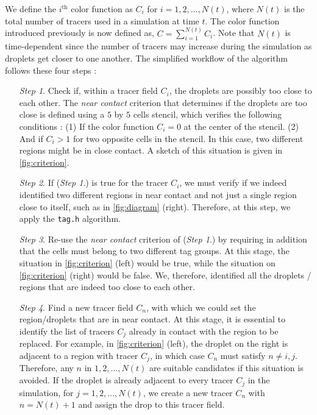 \documentclass[11pt]{My_preprint}
\begin{document}
We define the $i^\text{th}$ color function as $C_i$ for $i =1,2,\ldots,N(t)$, where $N(t)$ is the total number of tracers used in a simulation at time $t$.
The color function introduced previously is now defined as, $C = \sum_{i=1}^{N(t)} C_i$. 
Note that $N(t)$ is time-dependent since the number of tracers may increase during the simulation as droplets get closer to one another.
The simplified workflow of the algorithm follows these four steps : 
\begin{enumerate}
    \item[\textit{Step 1}.] Check if, within a tracer field $C_i$, the droplets are possibly too close to each other. 
    The \textit{near contact} criterion that determines if the droplets are too close is defined using a $5$ by $5$ cells stencil, which verifies the following conditions : 
    (1) If the color function $C_i = 0$ at the center of the stencil. 
    (2) And if $C_i > 1$ for two opposite cells in the stencil. 
    In this case, two different regions might be in close contact.
    A sketch of this situation is given in \ref{fig:criterion}.  
    \item[\textit{Step 2}.] 
    If (\textit{Step 1}.) is true for the tracer $C_i$, we must verify if we indeed identified two different regions in near contact and not just a single region close to itself, such as in \ref{fig:diagram} (right). 
    Therefore, at this step, we apply the \texttt{tag.h} algorithm.
    \item[\textit{Step 3}.] Re-use the \textit{near contact} criterion of (\textit{Step 1}.) by requiring in addition that the cells must belong to two different tag groups. 
    At this stage, the situation in \ref{fig:criterion} (left) would be true, while the situation on \ref{fig:criterion} (right) would be false. 
    We, therefore, identified all the droplets / regions that are indeed too close to each other. 
    \item[\textit{Step 4}.] 
    Find a new tracer field $C_n$, with which we could set the region/droplets that are in near contact. 
    At this stage, it is essential to identify the list of tracers $C_j$ already in contact with the region to be replaced. 
    For example, in \ref{fig:criterion} (left), the droplet on the right is adjacent to a region with tracer $C_j$, in which case $C_n$ must satisfy $n \neq i,j$. 
    Therefore, any $n$ in $1, 2, \ldots, N(t)$ are suitable candidates if this situation is avoided. 
    If the droplet is already adjacent to every tracer $C_j$ in the simulation, for $j = 1, 2, \ldots, N(t)$, we create a new tracer $C_n$ with $n = N(t)+1$ and assign the drop to this tracer field.
\end{enumerate}
\end{document}
